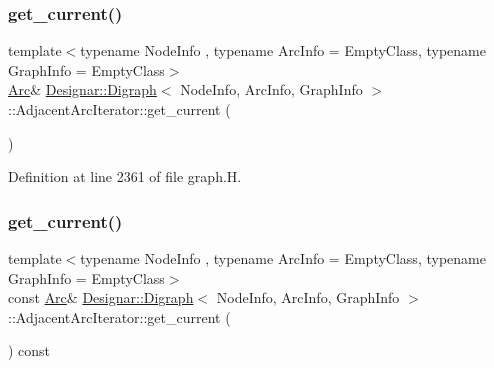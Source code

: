 \subsubsection{\texorpdfstring{get\+\_\+current()}{get\_current()}\hspace{0.1cm}{\footnotesize\ttfamily [1/2]}}
{\footnotesize\ttfamily template$<$typename Node\+Info , typename Arc\+Info  = Empty\+Class, typename Graph\+Info  = Empty\+Class$>$ \\
\hyperlink{class_designar_1_1_digraph_a0ceb278671f2a535c00fddccdeafd69f}{Arc}\& \hyperlink{class_designar_1_1_digraph}{Designar\+::\+Digraph}$<$ Node\+Info, Arc\+Info, Graph\+Info $>$\+::Adjacent\+Arc\+Iterator\+::get\+\_\+current (\begin{DoxyParamCaption}{ }\end{DoxyParamCaption})\hspace{0.3cm}{\ttfamily [inline]}}



Definition at line 2361 of file graph.\+H.

\mbox{\label{class_designar_1_1_digraph_1_1_adjacent_arc_iterator_ac388275a16db45fc754a193766c215ce}} 
\subsubsection{\texorpdfstring{get\+\_\+current()}{get\_current()}\hspace{0.1cm}{\footnotesize\ttfamily [2/2]}}
{\footnotesize\ttfamily template$<$typename Node\+Info , typename Arc\+Info  = Empty\+Class, typename Graph\+Info  = Empty\+Class$>$ \\
const \hyperlink{class_designar_1_1_digraph_a0ceb278671f2a535c00fddccdeafd69f}{Arc}\& \hyperlink{class_designar_1_1_digraph}{Designar\+::\+Digraph}$<$ Node\+Info, Arc\+Info, Graph\+Info $>$\+::Adjacent\+Arc\+Iterator\+::get\+\_\+current (\begin{DoxyParamCaption}{ }\end{DoxyParamCaption}) const\hspace{0.3cm}{\ttfamily [inline]}}



